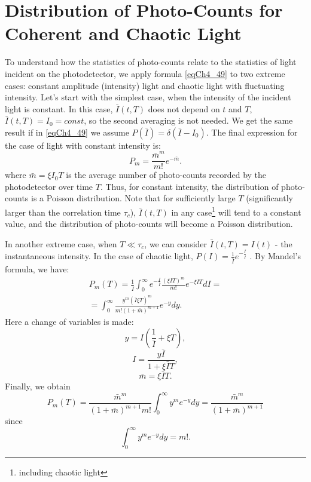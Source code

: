 \section{Distribution of Photo-Counts for Coherent and Chaotic Light}

To understand how the statistics of photo-counts relate to the statistics of light incident on the photodetector, we apply formula \eqref{eqCh4_49} to two extreme cases: constant amplitude (intensity) light and chaotic light with fluctuating intensity. Let's start with the simplest case, when the intensity of the incident light is constant. In this case, $\bar{I}\left(t, T\right)$ does not depend on $t$ and $T$, $\bar{I}\left(t, T\right) = I_0 = const$, so the second averaging is not needed. We get the same result if in \eqref{eqCh4_49} we assume $P\left(\bar{I}\right) = \delta\left(\bar{I} - I_0\right)$. The final expression for the case of light with constant intensity is: 
\begin{equation}
P_m = \frac{\bar{m}^m}{m!}e^{- \bar{m}}.
\label{eqCh4_50}
\end{equation}
where $\bar{m} = \xi I_0 T$ is the average number of photo-counts recorded by the photodetector over time $T$. Thus, for constant intensity, the distribution of photo-counts is a Poisson distribution. 
Note that for sufficiently large $T$ (significantly larger than the correlation time $\tau_c$), $\bar{I}\left(t, T\right)$ in any case\footnote{including chaotic light} will tend to a constant value, and the distribution of photo-counts will become a Poisson distribution. 
  
In another extreme case, when $T \ll \tau_c$, we can consider $\bar{I}\left(t, T\right) = I\left(t\right)$ - the instantaneous intensity. In the case of chaotic light, $P\left(I\right) = \frac{1}{\bar{I}} e^{- \frac{I}{\bar{I}}}$ \cite{bLoudon1976}.  
By Mandel's formula, we have:
\begin{eqnarray}
P_m\left(T\right) = \frac{1}{\bar{I}}\int_0^{\infty} e^{- \frac{I}{\bar{I}}}
\frac{\left(\xi I T\right)^m}{m!} e^{-
  \xi I T} d I = 
\nonumber \\
= \int_0^{\infty} \frac{y^m\left(\bar{I} \xi
  T\right)^m}{m!\left(1 + \bar{m}\right)^{m + 1}} e^{-y} dy.
\label{eqCh4_51}
\end{eqnarray}
Here a change of variables is made:
\[
y = I \left(\frac{1}{\bar{I}} + \xi T\right),
\]
\[
I = \frac{y \bar{I}}{1 + \xi \bar{I} T},
\]
\[
\bar{m} = \xi \bar{I} T.
\]
Finally, we obtain
\begin{equation}
P_m\left(T\right) = 
\frac{\bar{m}^m}{\left(1 + \bar{m}\right)^{m + 1} m!}
\int_0^{\infty}y^m e^{-y}dy = 
\frac{\bar{m}^m}{\left(1 + \bar{m}\right)^{m + 1}}
\label{eqCh4_52}
\end{equation}
since
\[
\int_0^{\infty}y^m e^{-y}dy = m!.
\]

